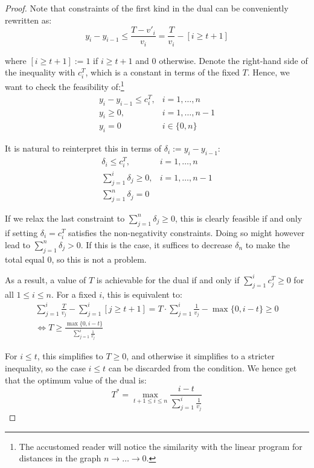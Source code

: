 \documentclass[sigconf,nonacm]{aamas}
\begin{document}
\begin{proof}
Note that constraints of the first kind in the dual can be conveniently rewritten as:%
%
\[
    y_i - y_{i - 1} \leq \frac{T - v'_i}{v_i} = \frac{T}{v_i} - [i \geq t + 1]
\]

\noindent where $[i \geq t + 1] := 1$ if $i \geq t + 1$ and $0$ otherwise. Denote the right-hand side of the inequality with $c^T_i$, which is a constant in terms of the fixed $T$. Hence, we want to check the feasibility of:\footnote{The accustomed reader will notice the similarity with the linear program for distances in the graph $n \rightarrow \dots \rightarrow 0$.}
%
\begin{equation*}
\begin{array}{ll}
y_i - y_{i - 1} \leq c^T_i, & i = 1, \dots, n \\ 
y_i \geq 0, & i = 1, \dots, n - 1 \\
y_i = 0     & i \in \{0, n\}
\end{array}
\end{equation*}

It is natural to reinterpret this in terms of $\delta_i := y_i - y_{i - 1}$:
%
\begin{equation*}
\begin{array}{ll}
\delta_i \leq c^T_i, & i = 1, \dots, n \\ 
\sum_{j = 1}^i \delta_j \geq 0, & i = 1, \dots, n - 1 \\
\sum_{j = 1}^n \delta_j = 0     &
\end{array}
\end{equation*}

If we relax the last constraint to $\sum_{j = 1}^n \delta_j \geq 0$, this is clearly feasible if and only if setting $\delta_i = c^T_i$ satisfies the non-negativity constraints. Doing so might however lead to $\sum_{j = 1}^n \delta_j > 0$. If this is the case, it suffices to decrease $\delta_n$ to make the total equal 0, so this is not a problem.

As a result, a value of $T$ is achievable for the dual if and only if $\sum_{j = 1}^i c^T_j \geq 0$ for all $1 \leq i \leq n$. For a fixed $i$, this is equivalent to:
%
\begin{gather*}
   \sum_{j = 1}^i \frac{T}{v_j} - \sum_{j = 1}^i [j \geq t + 1] = T \cdot \sum_{j = 1}^i \frac{1}{v_j} - \max\{0, i - t\} \geq 0 \\ \iff 
   T \geq \frac{\max\{0, i - t\}}{\sum_{j = 1}^i \frac{1}{v_j}}
\end{gather*}

For $i \leq t$, this simplifies to $T \geq 0$, and otherwise it simplifies to a stricter inequality, so the case $i \leq t$ can be discarded from the condition. We hence get that the optimum value of the dual is:
%
\[
T^* = \max_{t + 1 \leq i \leq n}\frac{i - t}{\sum_{j = 1}^i \frac{1}{v_j}}
\]


\end{proof}
\end{document}
